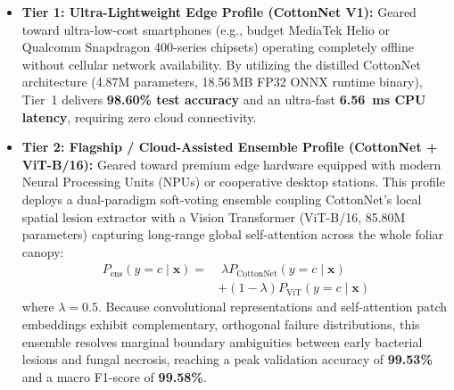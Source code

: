 \documentclass[journal,10pt,twocolumn]{IEEEtran}
\begin{document}
\begin{itemize}[leftmargin=*]
    \item \textbf{Tier 1: Ultra-Lightweight Edge Profile (CottonNet V1):} Geared toward ultra-low-cost smartphones (e.g., budget MediaTek Helio or Qualcomm Snapdragon 400-series chipsets) operating completely offline without cellular network availability. By utilizing the distilled CottonNet architecture (4.87M parameters, 18.56\,MB FP32 ONNX runtime binary), Tier~1 delivers \textbf{98.60\% test accuracy} and an ultra-fast \textbf{6.56~ms CPU latency}, requiring zero cloud connectivity.
    \item \textbf{Tier 2: Flagship / Cloud-Assisted Ensemble Profile (CottonNet + ViT-B/16):} Geared toward premium edge hardware equipped with modern Neural Processing Units (NPUs) or cooperative desktop stations. This profile deploys a dual-paradigm soft-voting ensemble coupling CottonNet's local spatial lesion extractor with a Vision Transformer (ViT-B/16, 85.80M parameters) capturing long-range global self-attention across the whole foliar canopy:
    \begin{align}
    P_{\text{ens}}(y=c \mid \mathbf{x}) = &\;\lambda P_{\text{CottonNet}}(y=c \mid \mathbf{x}) \nonumber \\
    & + (1-\lambda) P_{\text{ViT}}(y=c \mid \mathbf{x})
    \end{align}
    where $\lambda = 0.5$. Because convolutional representations and self-attention patch embeddings exhibit complementary, orthogonal failure distributions, this ensemble resolves marginal boundary ambiguities between early bacterial lesions and fungal necrosis, reaching a peak validation accuracy of \textbf{99.53\%} and a macro F1-score of \textbf{99.58\%}.
\end{itemize}

\begin{table}[ht]
\centering
\caption{Tiered edge-versus-flagship architectural specifications.}
\label{tab:tiered_deployment}
\end{table}
\end{document}
